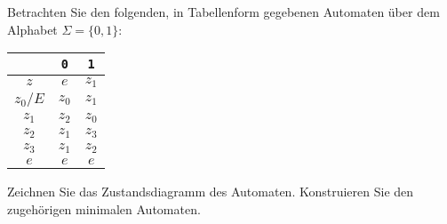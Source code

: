 Betrachten Sie den folgenden, in Tabellenform gegebenen
Automaten über dem Alphabet $\Sigma=\{0,1\}$:
\begin{center}
\begin{tabular}{|c|cc|}
\hline
&{\tt 0}&{\tt 1}\\
\hline
$z$&$e$&$z_1$\\
$z_0/E$&$z_0$&$z_1$\\
$z_1$&$z_2$&$z_0$\\
$z_2$&$z_1$&$z_3$\\
$z_3$&$z_1$&$z_2$\\
$e$&$e$&$e$\\
\hline
\end{tabular}
\end{center}
Zeichnen Sie das Zustandsdiagramm des Automaten. Konstruieren Sie den
zugehörigen minimalen Automaten.


